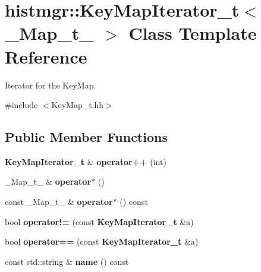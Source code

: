 \section{histmgr\-:\-:Key\-Map\-Iterator\-\_\-t$<$ \-\_\-\-Map\-\_\-t\-\_\- $>$ Class Template Reference}
\label{classhistmgr_1_1KeyMapIterator__t}


Iterator for the Key\-Map.  




{\ttfamily \#include $<$Key\-Map\-\_\-t.\-hh$>$}

\subsection*{Public Member Functions}
\begin{DoxyCompactItemize}
\item 
{\bf Key\-Map\-Iterator\-\_\-t} \& {\bfseries operator++} (int)\label{classhistmgr_1_1KeyMapIterator__t_a8dcf109b5967c4c11f0e52d4aef777f3}

\item 
\-\_\-\-Map\-\_\-t\-\_\- \& {\bfseries operator$\ast$} ()\label{classhistmgr_1_1KeyMapIterator__t_a33664e3b5550d2fdd286f1669efa7d10}

\item 
const \-\_\-\-Map\-\_\-t\-\_\- \& {\bfseries operator$\ast$} () const \label{classhistmgr_1_1KeyMapIterator__t_af5a8d583bcf26ff7866df066d200598e}

\item 
bool {\bfseries operator!=} (const {\bf Key\-Map\-Iterator\-\_\-t} \&a)\label{classhistmgr_1_1KeyMapIterator__t_ae02f2c50b69107f3eb9b31a9828560f8}

\item 
bool {\bfseries operator==} (const {\bf Key\-Map\-Iterator\-\_\-t} \&a)\label{classhistmgr_1_1KeyMapIterator__t_aef04b811fd364003d920e2af59ef58f2}

\item 
const std\-::string \& {\bfseries name} () const \label{classhistmgr_1_1KeyMapIterator__t_ad4fc569584ae74eeed57ad051f243e9a}

\end{DoxyCompactItemize}
